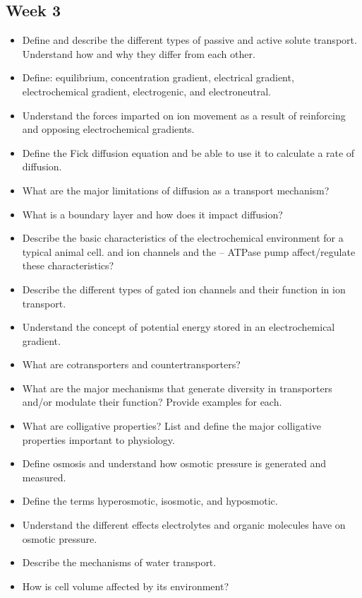 \documentclass[12pt,a4paper]{article}
\begin{document}
\subsection{Week 3}
\begin{itemize}
    \item Define and describe the different types of passive and active solute transport. Understand how and why they differ from each other.
    \item Define: equilibrium, concentration gradient, electrical gradient, electrochemical gradient, electrogenic, and electroneutral. 
    \item Understand the forces imparted on ion movement as a result of reinforcing and opposing electrochemical gradients.
    \item Define the Fick diffusion equation and be able to use it to calculate a rate of diffusion. 
    \item What are the major limitations of diffusion as a transport mechanism? 
    \item What is a boundary layer and how does it impact diffusion?
    \item Describe the basic characteristics of the electrochemical environment for a typical animal cell.  and  ion channels and the -- ATPase pump affect/regulate these characteristics?
    \item Describe the different types of gated ion channels and their function in ion transport.
    \item Understand the concept of potential energy stored in an electrochemical gradient. 
    \item What are cotransporters and countertransporters?
    \item What are the major mechanisms that generate diversity in transporters and/or modulate their function? Provide examples for each.
    \item What are colligative properties? List and define the major colligative properties important to physiology.
    \item Define osmosis and understand how osmotic pressure is generated and measured.
    \item Define the terms hyperosmotic, isosmotic, and hyposmotic.
    \item Understand the different effects electrolytes and organic molecules have on osmotic pressure.
    \item Describe the mechanisms of water transport.
    \item How is cell volume affected by its environment?
\end{itemize}
\end{document}
